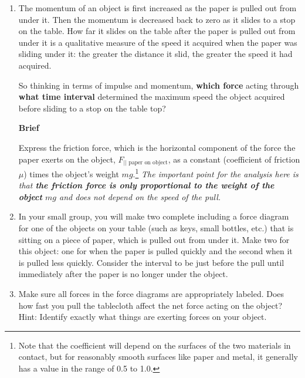 \begin{enumerate}
	\item The momentum of an object is first increased as the paper is pulled out from under it. Then the momentum is decreased back to zero as it slides to a stop on the table. How far it slides on the table after the paper is pulled out from under it is a qualitative measure of the speed it acquired when the paper was sliding under it: the greater the distance it slid, the greater the speed it had acquired.
	
	So thinking in terms of impulse and momentum, \textbf{which force} acting through \textbf{what time interval} determined the maximum speed the object acquired before sliding to a stop on the table top?

\hspace{-\textwidth}\hspace{\linewidth} \textbf{Brief}
\hspace{\textwidth}\hspace{-\linewidth}
\WCD

	Express the friction force, which is the horizontal component of the force the paper exerts on the object, $F_{||\text{ paper on object}}$, as a constant (coefficient of friction $\mu$) times the object's weight $mg$.\footnote{Note that the coefficient will depend on the surfaces of the two materials in contact, but for reasonably smooth surfaces like paper and metal, it generally has a value in the range of 0.5 to 1.0.} \emph{The important point for the analysis here is that \textbf{the friction force is only proportional to the weight of the object} $mg$ and does \emph{not} depend on the speed of the pull.}
	
	\item In your small group, you will make two complete \pcharts{} including a force diagram for one of the objects on your table (such as keys, small bottles, etc.) that is sitting on a piece of paper, which is pulled out from under it. Make two \pcharts{} for this object: one for when the paper is pulled quickly and the second when it is pulled less quickly. Consider the interval to be just before the pull until immediately after the paper is no longer under the object.
	
	\item Make sure all forces in the force diagrams are appropriately labeled. Does how fast you pull the tablecloth affect the net force acting on the object? Hint: Identify exactly what things are exerting forces on your object.
	

\end{enumerate}

